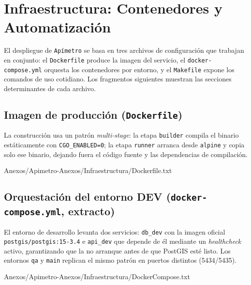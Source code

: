 
\section{Infraestructura: Contenedores y Automatización}
\label{anx:apimetro-infra}

El despliegue de \texttt{Apímetro} se basa en tres archivos de configuración que
trabajan en conjunto: el \texttt{Dockerfile} produce la imagen del servicio, el
\texttt{docker-compose.yml} orquesta los contenedores por entorno, y el
\texttt{Makefile} expone los comandos de uso cotidiano. Los fragmentos
siguientes muestran las secciones determinantes de cada archivo.

\subsection*{Imagen de producción (\texttt{Dockerfile})}

La construcción usa un patrón \textit{multi-stage}: la etapa \texttt{builder}
compila el binario estáticamente con \texttt{CGO\_ENABLED=0}; la etapa
\texttt{runner} arranca desde \texttt{alpine} y copia solo ese binario, dejando
fuera el código fuente y las dependencias de compilación.

 {Anexos/Apimetro-Anexos/Infraestructura/Dockerfile.txt}

\subsection*{Orquestación del entorno DEV
(\texttt{docker-compose.yml}, extracto)}

El entorno de desarrollo levanta dos servicios: \texttt{db\_dev} con la imagen
oficial \texttt{postgis/postgis:15-3.4} e \texttt{api\_dev} que depende de él
mediante un \textit{healthcheck} activo, garantizando que la \api{} no arranque
antes de que PostGIS esté listo. Los entornos \texttt{qa} y \texttt{main}
replican el mismo patrón en puertos distintos (5434/5435).

 {Anexos/Apimetro-Anexos/Infraestructura/DockerCompose.txt}

